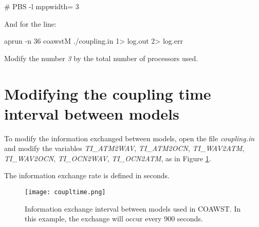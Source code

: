\begin{bashcode}
\# PBS -l mppwidth= 3
\end{bashcode}
\bigskip

\noindent And for the line:
\bigskip

\begin{bashcode}
aprun -n 36 coawstM ./coupling.in 1> log.out 2> log.err
\end{bashcode}
\bigskip

\noindent Modify the number \textit{3} by the total number of processors used.
\bigskip

\section{Modifying the coupling time interval between models}
\bigskip

\noindent To modify the information exchanged between models, open the file \textit{coupling.in} and
modify the variables \textit{TI\_ATM2WAV}, \textit{TI\_ATM2OCN}, \textit{TI\_WAV2ATM}, \textit{TI\_WAV2OCN}, \textit{TI\_OCN2WAV},
          \textit{TI\_OCN2ATM}, as in Figure \textcolor{bleu_cite}{\ref{taxaacopla}}.
\bigskip

\begin{tcolorbox}[enhanced,
  grow to left by=0cm,%
  grow to right by=0cm,%
  enlarge top by=0cm,%
  enlarge bottom by=0cm,%
  tcbox raise base,
  boxrule=1.0pt,
  left=18mm,
  colframe=yellow!50!black,coltext=yellow!25!black,colback=yellow!10!white,
  overlay={\begin{tcbclipinterior}\fill[yellow!75!blue!50!white] (frame.south west)
    rectangle node[text=white,font=\sffamily\bfseries\footnotesize,rotate=0] {ATTENTION} ([xshift=18mm]frame.north west);\end{tcbclipinterior}}]
    The information exchange rate is defined in seconds.
\end{tcolorbox}
\bigskip

\begin{figure}[H]
    \centering
    \texttt{[image: coupltime.png]}
    \caption{Information exchange interval between models used in COAWST. In this example, the exchange will occur every 900 seconds.}
    \label{taxaacopla}
\end{figure}
\bigskip
